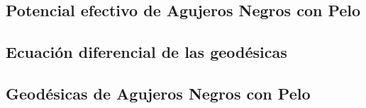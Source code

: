 \documentclass[../Main.tex]{subfiles}
\begin{document}
\subsection{Potencial efectivo de Agujeros Negros con Pelo}
\subsection{Ecuación diferencial de las geodésicas}
\subsection{Geodésicas de Agujeros Negros con Pelo}







\biblio %
\end{document}
